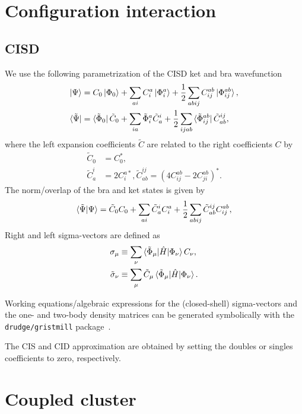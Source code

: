 \documentclass{article}
\begin{document}
\section{Configuration interaction}
\subsection{CISD}
We use the following parametrization of the CISD ket and bra wavefunction
\begin{align}
    \ket{\Psi} &= C_0 \ket{\Phi_0} + \sum_{ai} C^a_i \ket{\Phi^a_i} + \frac{1}{2} \sum_{abij} C^{ab}_{ij} \ket{\Phi^{ab}_{ij}}, \\ 
    \bra{\tilde{\Psi}} &= \bra{\tilde{\Phi}_0} \tilde{C}_0 + \sum_{ia} \tilde{\Phi}^a_i \tilde{C}^i_a + \frac{1}{2} \sum_{ijab} \bra{\tilde{\Phi}^{ab}_{ij}}\tilde{C}^{ij}_{ab}, 
\end{align}
where the left expansion coefficients $\tilde{C}$ are related to the right coefficients $C$ by
\begin{align}
    \tilde{C}_0 &= C_0^*, \\
    \tilde{C}^i_a &= 2 C^{a *}_i,
    \tilde{C}^{ij}_{ab} = \left(4C^{ab}_{ij}-2C^{ab}_{ji} \right)^*.
\end{align}
The norm/overlap of the bra and ket states is given by
\begin{equation}
    \braket{\tilde{\Psi}|\Psi} = \tilde{C}_0 C_0 + \sum_{ai} \tilde{C}^i_a C^a_i + \frac{1}{2} \sum_{abij} \tilde{C}^{ij}_{ab} C^{ab}_{ij},
\end{equation}
Right and left sigma-vectors are defined as
\begin{align}
\sigma_\mu &\equiv \sum_\nu \braket{\tilde{\Phi}_\mu|\hat{H}|\Phi_\nu} C_\nu, \\ 
\tilde{\sigma}_\nu &\equiv \sum_\mu \tilde{C}_\mu \braket{\tilde{\Phi}_\mu|\hat{H}|\Phi_\nu}.
\end{align}

Working equations/algebraic expressions for the (closed-shell) sigma-vectors and the one- and two-body density matrices can be generated symbolically with the \texttt{drudge/gristmill} package~\cite{DrudgeCAS, Zhao2018Drudge}.

The CIS and CID approximation are obtained by setting the doubles or singles coefficients to zero, respectively.

\section{Coupled cluster}
\end{document}
